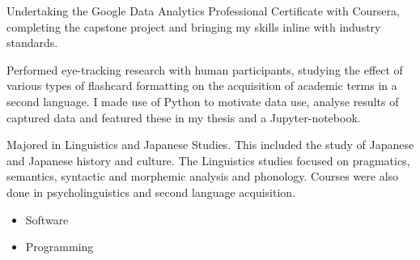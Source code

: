 \documentclass[10pt,a4paper,ragged2e,withhyper]{altacv}
\begin{document}
\begin{paracol}{2}
\label{sec:org3d82559}




{}
\label{sec:org9084aff}
Undertaking the Google Data Analytics Professional Certificate with Coursera, completing the capstone project and bringing my skills inline with industry standards.
\par\divider
{}
Performed eye-tracking research with human participants, studying the effect of
various types of flashcard formatting on the acquisition of academic terms in a
second language. I made use of Python to motivate data use, analyse results of captured data and featured these in my thesis and a Jupyter-notebook.
\par\divider
{}
Majored in Linguistics and Japanese Studies. This included the study of Japanese and Japanese history and culture. The Linguistics studies focused on pragmatics, semantics, syntactic and morphemic analysis and phonology. Courses were also done in psycholinguistics and second language acquisition.

\label{sec:org72b010c}
\begin{itemize}
\item Software
\end{itemize}
\begin{itemize}
\item Programming
\end{itemize}
\cvtag{\LaTeX}

\end{paracol}
\end{document}
